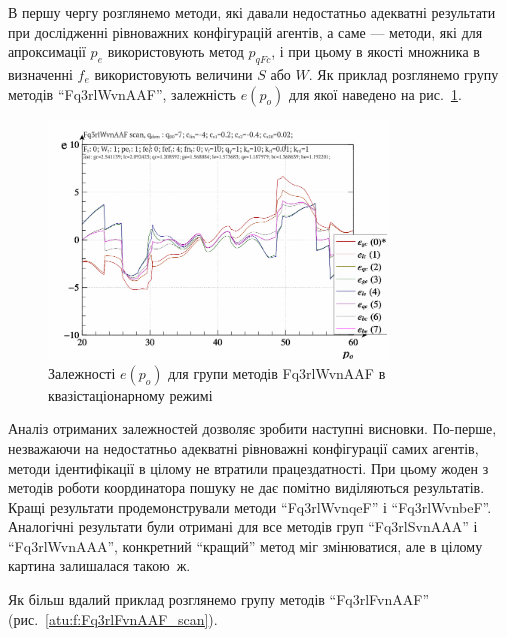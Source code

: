 В першу чергу розглянемо методи, які давали недостатньо
адекватні результати при дослідженні рівноважних конфігурацій
агентів, а саме --- методи, які для апроксимації
$ p_e $ використовують метод
$ p_{qFc} $, і при цьому в якості множника в визначенні
$ f_e $ використовують величини
$ S $ або
$ W $. Як приклад розглянемо групу методів ``Fq3rlWvnAAF'', залежність
$e(p_o)$ для якої наведено на рис.~\ref{atu:f:Fq3rlWvnAAF_scan}.

\begin{figure}[htb!]
  \begin{center}
    \includegraphics[width=0.8\textwidth]{p/scan/qls-p_p_e_Fq3rlWvnAAF_scan.png}
  \end{center}
  \caption{Залежності $e(p_o)$ для групи методів Fq3rlWvnAAF в квазістаціонарному режимі}
  \label{atu:f:Fq3rlWvnAAF_scan}
\end{figure}


Аналіз отриманих залежностей дозволяє зробити наступні
висновки. По-перше, незважаючи на недостатньо адекватні
рівноважні конфігурації самих агентів, методи ідентифікації в
цілому не втратили працездатності. При цьому жоден з методів
роботи координатора пошуку не дає помітно виділяються
результатів. Кращі результати продемонстрували методи ``Fq3rlWvnqeF''
і ``Fq3rlWvnbeF''. Аналогічні результати були отримані для все
методів груп ``Fq3rlSvnAAA'' і ``Fq3rlWvnAAA'', конкретний ``кращий'' метод
міг змінюватися, але в цілому картина залишалася такою~ж.

Як більш вдалий приклад розглянемо групу методів ``Fq3rlFvnAAF''
(рис.~\ref{atu:f:Fq3rlFvnAAF_scan}).


